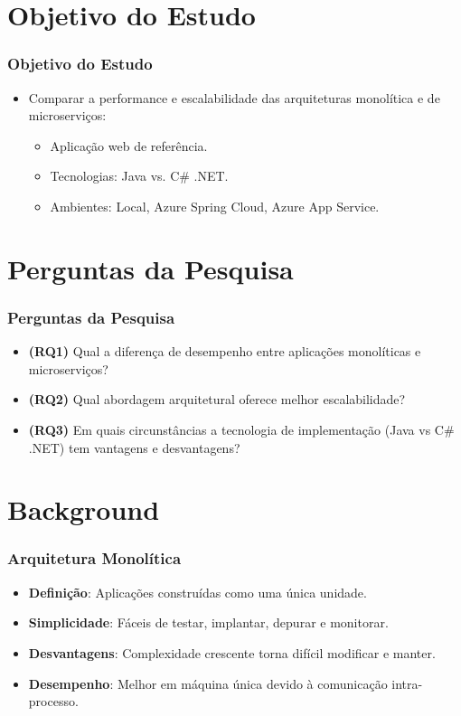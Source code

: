 \documentclass{beamer}
\begin{document}
\section{Objetivo do Estudo}

\begin{frame}
\frametitle{Objetivo do Estudo}
\begin{itemize}
    \item Comparar a performance e escalabilidade das arquiteturas monolítica e de microserviços:
    \begin{itemize}
        \item Aplicação web de referência.
        \item Tecnologias: Java vs. C\# .NET.
        \item Ambientes: Local, Azure Spring Cloud, Azure App Service.
    \end{itemize}
\end{itemize}
\end{frame}

\section{Perguntas da Pesquisa}

\begin{frame}
\frametitle{Perguntas da Pesquisa}
\begin{itemize}
    \item \textbf{(RQ1)} Qual a diferença de desempenho entre aplicações monolíticas e microserviços?
    \item \textbf{(RQ2)} Qual abordagem arquitetural oferece melhor escalabilidade?
    \item \textbf{(RQ3)} Em quais circunstâncias a tecnologia de implementação (Java vs C\# .NET) tem vantagens e desvantagens?
\end{itemize}
\end{frame}

\section{Background}

\begin{frame}
\frametitle{Arquitetura Monolítica}
\begin{itemize}
    \item \textbf{Definição}: Aplicações construídas como uma única unidade.
    \item \textbf{Simplicidade}: Fáceis de testar, implantar, depurar e monitorar.
    \item \textbf{Desvantagens}: Complexidade crescente torna difícil modificar e manter.
    \item \textbf{Desempenho}: Melhor em máquina única devido à comunicação intra-processo.
\end{itemize}
\end{frame}
\end{document}
